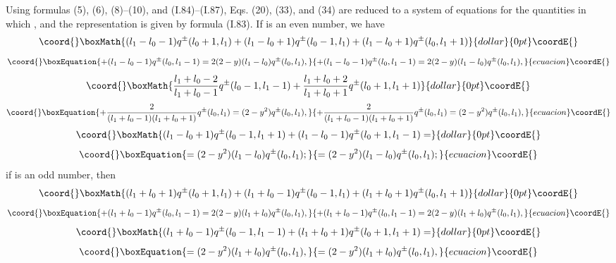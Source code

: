 \documentclass[a4paper,12pt]{article}
\begin{document}
Using formulas (5), (6), (8)--(10), and (I.84)--(I.87), Eqs. (20), (33), and
(34) are reduced to a system of equations for the quantities 
\coordHE{} in which 
\coordHE{}, and the representation \coordHE{} is given by formula 
(I.83). If \coordHE{} is an even number, we have
$$\coord{}\boxMath{(l_{1}-l_{0}-1)q^{\pm}(l_{0}+1,l_{1}) + (l_{1}-l_{0}+1)q^{\pm}(l_{0}-1,l_{1})
+ (l_{1}-l_{0}+1)q^{\pm}(l_{0},l_{1}+1)}{dollar}{0pt}\coordE{}$$
\begin{equation}\coord{}\boxEquation{
+ (l_{1}-l_{0}-1)q^{\pm}(l_{0},l_{1}-1)
= 2(2-y)(l_{1}-l_{0})q^{\pm}(l_{0},l_{1}),
}{
+ (l_{1}-l_{0}-1)q^{\pm}(l_{0},l_{1}-1)
= 2(2-y)(l_{1}-l_{0})q^{\pm}(l_{0},l_{1}),
}{ecuacion}\coordE{}\end{equation}
$$\coord{}\boxMath{\frac{l_{1}+l_{0}-2}{l_{1}+l_{0}-1} q^{\pm}(l_{0}-1,l_{1}-1)
+\frac{l_{1}+l_{0}+2}{l_{1}+l_{0}+1} q^{\pm}(l_{0}+1,l_{1}+1)}{dollar}{0pt}\coordE{}$$
\begin{equation}\coord{}\boxEquation{
+\frac{2}{(l_{1}+l_{0}-1)(l_{1}+l_{0}+1)} q^{\pm}(l_{0},l_{1})
=(2-y^{2})q^{\pm}(l_{0},l_{1}),
}{
+\frac{2}{(l_{1}+l_{0}-1)(l_{1}+l_{0}+1)} q^{\pm}(l_{0},l_{1})
=(2-y^{2})q^{\pm}(l_{0},l_{1}),
}{ecuacion}\coordE{}\end{equation}
$$\coord{}\boxMath{(l_{1}-l_{0}+1)q^{\pm}(l_{0}-1,l_{1}+1)
+(l_{1}-l_{0}-1)q^{\pm}(l_{0}+1,l_{1}-1)=}{dollar}{0pt}\coordE{}$$
\begin{equation}\coord{}\boxEquation{
= (2-y^{2})(l_{1}-l_{0}) q^{\pm}(l_{0},l_{1});
}{
= (2-y^{2})(l_{1}-l_{0}) q^{\pm}(l_{0},l_{1});
}{ecuacion}\coordE{}\end{equation}
if \coordHE{} is an odd number, then
$$\coord{}\boxMath{(l_{1}+l_{0}+1)q^{\pm}(l_{0}+1,l_{1})
+ (l_{1}+l_{0}-1)q^{\pm}(l_{0}-1,l_{1})
+ (l_{1}+l_{0}+1)q^{\pm}(l_{0},l_{1}+1)}{dollar}{0pt}\coordE{}$$
\begin{equation}\coord{}\boxEquation{
+ (l_{1}+l_{0}-1)q^{\pm}(l_{0},l_{1}-1) 
= 2(2-y)(l_{1}+l_{0})q^{\pm} (l_{0},l_{1}),
}{
+ (l_{1}+l_{0}-1)q^{\pm}(l_{0},l_{1}-1) 
= 2(2-y)(l_{1}+l_{0})q^{\pm} (l_{0},l_{1}),
}{ecuacion}\coordE{}\end{equation}
$$\coord{}\boxMath{(l_{1}+l_{0}-1)q^{\pm}(l_{0}-1,l_{1}-1)
+(l_{1}+l_{0}+1)q^{\pm}(l_{0}+1,l_{1}+1)=}{dollar}{0pt}\coordE{}$$
\begin{equation}\coord{}\boxEquation{
= (2-y^{2})(l_{1}+l_{0}) q^{\pm}(l_{0},l_{1}),
}{
= (2-y^{2})(l_{1}+l_{0}) q^{\pm}(l_{0},l_{1}),
}{ecuacion}\coordE{}\end{equation}
\end{document}
